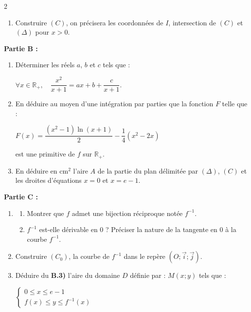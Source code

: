 \documentclass[12pt,a4paper]{article}
\begin{document}
\begin{multicols}{2}
\begin{enumerate}
\item Construire \( (C) \), on précisera les coordonnées de \( I \), intersection de \( (C) \) et \( (\Delta) \) pour \( x > 0 \).

\end{enumerate}
\textbf{Partie B :}
\begin{enumerate}
    \item Déterminer les réels \( a \), \( b \) et \( c \) tels que :
    
    \(
    \forall x \in \mathbb{R}_+, \quad \dfrac{x^2}{x + 1} = ax + b + \dfrac{c}{x + 1}.
    \)

    \item En déduire au moyen d’une intégration par parties que la fonction \( F \) telle que :

    \(
    F(x) = \dfrac{(x^2 - 1)\ln(x + 1)}{2} - \dfrac{1}{4}(x^2 - 2x)
    \)

    est une primitive de \( f \) sur \( \mathbb{R}_+ \).

    \item En déduire en \( \text{cm}^2 \) l’aire \( A \) de la partie du plan délimitée par \( (\Delta) \), \( (C) \) et les droites d’équations \( x = 0 \) et \( x = e - 1 \).
\end{enumerate}

\textbf{Partie C :}
\begin{enumerate}
\item 
    \begin{enumerate}
        \item Montrer que \( f \) admet une bijection réciproque notée \( f^{-1} \).
        \item \( f^{-1} \) est-elle dérivable en 0 ? Préciser la nature de la tangente en 0 à la courbe \( f^{-1} \).
    \end{enumerate}
    \item Construire \( (C_0) \), la courbe de \( f^{-1} \) dans le repère \( (O ; \vec{i} ; \vec{j}) \).

    \item Déduire du \textbf{B.3)} l’aire du domaine \( D \) définie par : \( M(x ; y) \) tels que :
    
    \(
    \left\{
    \begin{array}{l}
    0 \leq x \leq e - 1 \\
    f(x) \leq y \leq f^{-1}(x)
    \end{array}
    \right.
    \)
\end{enumerate}


\end{multicols}
\end{document}
